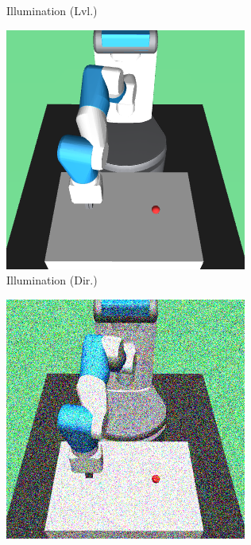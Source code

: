 \begin{figure}[h!]
\begin{subfigure}{0.32\textwidth}
    \caption{Illumination (Lvl.)}
  \end{subfigure}
  \begin{subfigure}{0.32\textwidth}
    \includegraphics[width=\textwidth]{figures/chapter6/test_observations/illumination_dir}
    \caption{Illumination (Dir.)}
  \end{subfigure}
  \begin{subfigure}{0.32\textwidth}
    \includegraphics[width=\textwidth]{figures/chapter6/test_observations/noise}

\end{subfigure}
\end{figure}
